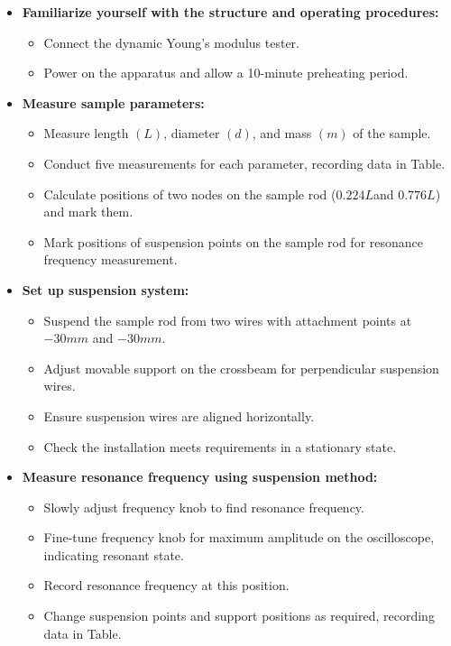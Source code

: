 \documentclass[UTF8]{article}
\begin{document}
\begin{itemize}

    \item \textbf{Familiarize yourself with the structure and operating procedures:}
    \begin{itemize}
        \item Connect the dynamic Young's modulus tester.
        \item Power on the apparatus and allow a 10-minute preheating period.
    \end{itemize}

    \item \textbf{Measure sample parameters:}
    \begin{itemize}
        \item Measure length $(L)$, diameter $(d)$, and mass $(m)$ of the sample.
        \item Conduct five measurements for each parameter, recording data in Table.
        \item Calculate positions of two nodes on the sample rod ($0.224L $and $0.776L$) and mark them.
        \item Mark positions of suspension points on the sample rod for resonance frequency measurement.
    \end{itemize}

    \item \textbf{Set up suspension system:}
    \begin{itemize}
        \item Suspend the sample rod from two wires with attachment points at$ -30mm$ and $-30mm$.
        \item Adjust movable support on the crossbeam for perpendicular suspension wires.
        \item Ensure suspension wires are aligned horizontally.
        \item Check the installation meets requirements in a stationary state.
    \end{itemize}

    \item \textbf{Measure resonance frequency using suspension method:}
    \begin{itemize}
        \item Slowly adjust frequency knob to find resonance frequency.
        \item Fine-tune frequency knob for maximum amplitude on the oscilloscope, indicating resonant state.
        \item Record resonance frequency at this position.
        \item Change suspension points and support positions as required, recording data in Table.
    \end{itemize}


\end{itemize}
\end{document}
